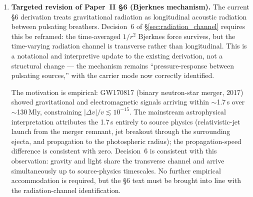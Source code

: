 \documentclass[11pt,a4paper]{article}
\begin{document}
\begin{enumerate}
\item \textbf{Targeted revision of Paper~II \S6 (Bjerknes mechanism).}
      The current \S6 derivation treats gravitational radiation as
      longitudinal acoustic radiation between pulsating breathers.
      Decision~6 of \S\ref{sec:radiation_channel} requires this be
      reframed: the time-averaged $1/r^2$ Bjerknes force survives, but
      the time-varying radiation channel is transverse rather than
      longitudinal.  This is a notational and interpretive update to
      the existing derivation, not a structural change --- the
      mechanism remains ``pressure-response between pulsating
      sources,'' with the carrier mode now correctly identified.

      The motivation is empirical: GW170817 (binary neutron-star
      merger, 2017) showed gravitational and electromagnetic signals
      arriving within $\sim$1.7\,s over $\sim$130\,Mly, constraining
      $|\Delta v|/v \lesssim 10^{-15}$.  The mainstream astrophysical
      interpretation attributes the 1.7\,s entirely to source physics
      (relativistic-jet launch from the merger remnant, jet breakout
      through the surrounding ejecta, and propagation to the
      photospheric radius); the propagation-speed difference is
      consistent with zero.  Decision~6 is consistent with this
      observation: gravity and light share the transverse channel and
      arrive simultaneously up to source-physics timescales.  No
      further empirical accommodation is required, but the \S6 text
      must be brought into line with the radiation-channel
      identification.


\end{enumerate}
\end{document}
